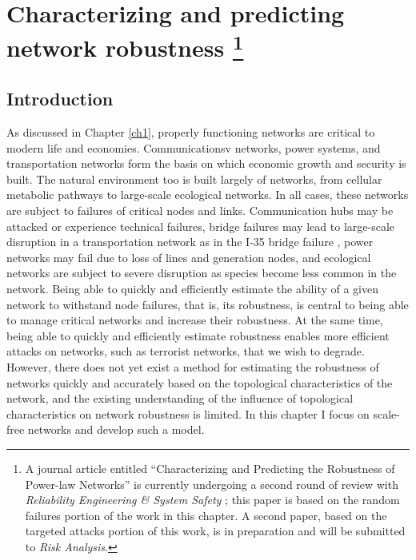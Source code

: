 
\chapter[Characterizing and predicting network robustness]{Characterizing and predicting network robustness \footnote[3]{A journal article entitled ``Characterizing and Predicting the Robustness of Power-law Networks'' is currently undergoing a second round of review with \emph{Reliability Engineering \& System Safety} \cite{LaRocca2014a}; this paper is based on the random failures portion of the work in this chapter.  A second paper, based on the targeted attacks portion of this work, is in preparation and will be submitted to \emph{Risk Analysis}.}}
\label{ch2}


\section{Introduction}
\label{sec:ch2:intro}

As discussed in Chapter \ref{ch1}, properly functioning networks are critical to modern life and economies. Communicationsv networks, power systems, and transportation networks form the basis on which economic growth and security is built. The natural environment too is built largely of networks, from cellular metabolic pathways to large-scale ecological networks. In all cases, these networks are subject to failures of critical nodes and links. Communication hubs may be attacked or experience technical failures, bridge failures may lead to large-scale disruption in a transportation network as in the I-35 bridge failure \cite{Sander2007}, power networks may fail due to loss of lines and generation nodes, and ecological networks are subject to severe disruption as species become less common in the network. Being able to quickly and efficiently estimate the ability of a given network to withstand node failures, that is, its robustness, is central to being able to manage critical networks and increase their robustness. At the same time, being able to quickly and efficiently estimate robustness enables more efficient attacks on networks, such as terrorist networks, that we wish to degrade. However, there does not yet exist a method for estimating the robustness of networks quickly and accurately based on the topological characteristics of the network, and the existing understanding of the influence of topological characteristics on network robustness is limited. In this chapter I focus on scale-free networks and develop such a model.

